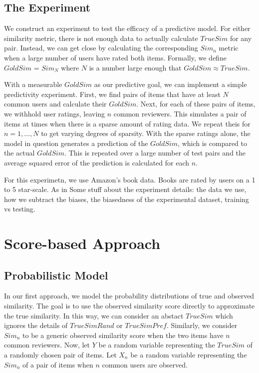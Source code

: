 \documentclass[11pt]{article}
\begin{document}
\subsection*{The Experiment}
We construct an experiment to test the efficacy of a predictive model. 
For either similarity metric, there is not enough data to actually calculate
$TrueSim$ for any pair. Instead, we can get close by calculating the
corresponding $Sim_n$ metric when a large number of users have rated both 
items. Formally, we define $GoldSim$ = $Sim_N$ where $N$ is a number large 
enough that $GoldSim \approx TrueSim$.

With a measurable $GoldSim$ as our predictive goal, we can implement a simple
predictivity experiment. First, we find pairs of items that have at least 
$N$ common users and calculate their $GoldSim$. Next, for each of these pairs
of items, we withhold user ratings, leaving $n$ common reviewers. This 
simulates a pair of items at times when there is a sparse amount of rating data. 
We repeat theis for $n=1,...,N$ to get varying degrees of sparsity. With the
sparse ratings alone, the model in question generates a prediction of the 
$GoldSim$, which is compared to the actual $GoldSim$. This is repeated over 
a large number of test pairs and the average squared error of the prediction 
is calculated for each $n$.

For this experimetn, we use Amazon's book data. Books are rated by users on a 1
to 5 star-scale. As in 
Some stuff about the experiment details: the data we use, how we subtract the
biases, the biasedness of the experimental dataset, training vs testing.

\section*{Score-based Approach}
\subsection*{Probabilistic Model}

In our first approach, we model the probability distributions of true and 
observed similarity. The goal is to use the observed similarity score directly 
to approximate the true similarity. In this way, we can consider an abstact 
$TrueSim$ which ignores the details of $TrueSimRand$ or $TrueSimPref$. 
Similarly, we consider $Sim_n$ to be a generic observed similarity score when
the two items have $n$ common reviewers. Now, let $Y$ be a random variable 
representing the $TrueSim$ of a randomly chosen pair of items. Let $X_{n}$ be a
random variable representing the $Sim_{n}$ of a pair of items when $n$ common 
users are observed.
\end{document}
